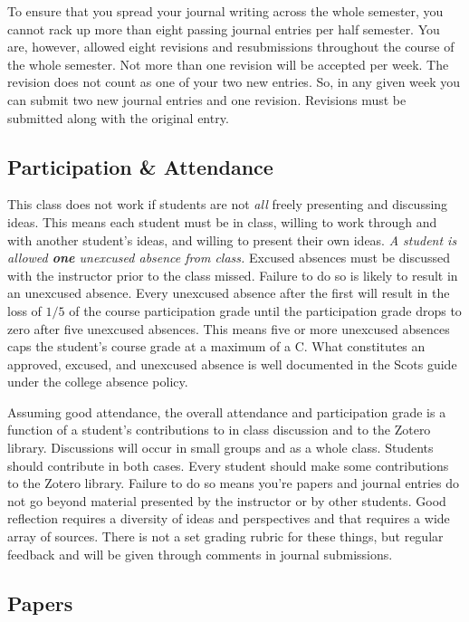 \documentclass[]{tufte-handout}
\begin{document}
To ensure that you spread your journal writing across the whole semester, you cannot rack up more than eight passing journal entries per half semester. You are, however, allowed eight revisions and resubmissions throughout the course of the whole semester. Not more than one revision will be accepted per week. The revision does not count as one of your two new entries. So, in any given week you can submit two new journal entries and one revision. Revisions must be submitted along with the original entry. 


\subsection{Participation \& Attendance}

This class does not work if students are not \textit{all} freely presenting and discussing ideas.  This means each student must be in class, willing to work through and with another student's ideas, and willing to present their own ideas.  \textit{A student is allowed \textbf{one} unexcused absence from class.} Excused absences must be discussed with the instructor prior to the class missed.  Failure to do so is likely to result in an unexcused absence.  Every unexcused absence after the first will result in the loss of $1/5$ of the course participation grade until the participation grade drops to zero after five unexcused absences. This means five or more unexcused absences caps the student's course grade at a maximum of a C. What constitutes an approved, excused, and unexcused absence is well documented in the Scots guide under the college absence policy. 

Assuming good attendance, the overall attendance and participation grade is a function of a student's contributions to in class discussion and to the Zotero library.  Discussions will occur in small groups and as a whole class. Students should contribute in both cases. Every student should make some contributions to the Zotero library.  Failure to do so means you're papers and journal entries do not go beyond material presented by the instructor or by other students.  Good reflection requires a diversity of ideas and perspectives and that requires a wide array of sources. There is not a set grading rubric for these things, but regular feedback and will be given through comments in journal submissions. 

\subsection{Papers}
\end{document}
